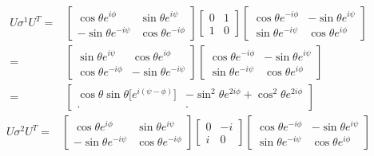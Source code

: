 \documentclass[]{article}
\begin{document}
\begin{align*}
	U \sigma^1 U^T  =&  \begin{bmatrix}
		\cos{\theta} e^{i\phi}&\sin{\theta}e^{i\psi}\\
		-\sin{\theta}e^{-i\psi}&\cos{\theta} e^{-i\phi}
	\end{bmatrix} \begin{bmatrix}
		0&1\\
		1&0
	\end{bmatrix} \begin{bmatrix}
		\cos{\theta} e^{-i\phi}&-\sin{\theta}e^{i\psi}\\
		\sin{\theta}e^{-i\psi}&\cos{\theta} e^{i\phi}
	\end{bmatrix}\\
	=&  \begin{bmatrix}
		\sin{\theta}e^{i\psi} & \cos{\theta} e^{i\phi}\\
		\cos{\theta} e^{-i\phi}&-\sin{\theta}e^{-i\psi}
	\end{bmatrix} \begin{bmatrix}
		\cos{\theta} e^{-i\phi}&-\sin{\theta}e^{i\psi}\\
		\sin{\theta}e^{-i\psi}&\cos{\theta} e^{i\phi}
	\end{bmatrix}\\
	=& \begin{bmatrix}
		\cos\theta \sin\theta\big[e^{i(\psi-\phi)}\big]&-\sin^2\theta e^{2i\phi} +\cos^2\theta e^{2i\phi}\\
		.&.
	\end{bmatrix}
\end{align*}
\begin{align*}
	U \sigma^2 U^T  =&  \begin{bmatrix}
		\cos{\theta} e^{i\phi}&\sin{\theta}e^{i\psi}\\
		-\sin{\theta}e^{-i\psi}&\cos{\theta} e^{-i\phi}
	\end{bmatrix} \begin{bmatrix}
		0&-i\\
		i&0
	\end{bmatrix} \begin{bmatrix}
		\cos{\theta} e^{-i\phi}&-\sin{\theta}e^{i\psi}\\
		\sin{\theta}e^{-i\psi}&\cos{\theta} e^{i\phi}
	\end{bmatrix}
\end{align*}
\end{document}
